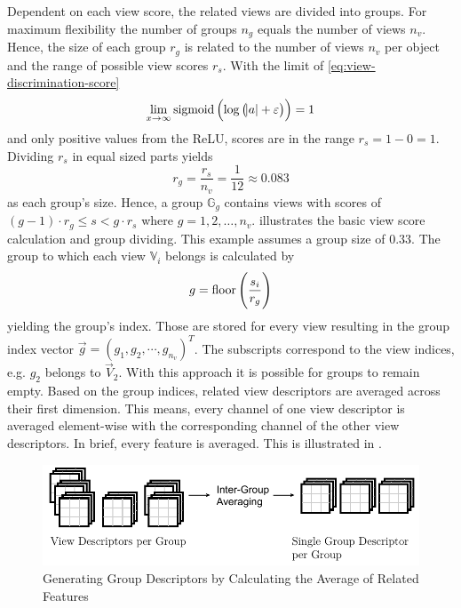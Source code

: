 Dependent on each view score, the related views are divided into groups.
For maximum flexibility the number of groups $n_g$ equals the number of views $n_v$.
Hence, the size of each group $r_g$ is related to the number of views $n_v$ per object and the range of possible view scores $r_s$.
With the limit of \eqref{eq:view-discrimination-score}
\begin{equation}
	\lim_{x\rightarrow \infty} \operatorname{sigmoid}\left( \log \left( \abs{a} + \varepsilon \right) \right) = 1
\end{equation}
and only positive values from the ReLU, scores are in the range $r_s = 1 - 0 = 1$.
Dividing $r_s$ in equal sized parts yields
\begin{equation}
	r_g = \frac{r_s}{n_v} = \frac{1}{12} \approx 0.083
\end{equation}
as each group's size.
Hence, a group $\mathbb{G}_g$ contains views with scores of $(g-1) \cdot r_g \leq s < g \cdot r_s$ where $g = {1,2, \dots, n_v}$.
 illustrates the basic view score calculation and group dividing.
This example assumes a group size of $0.33$.
The group to which each view $\mathbb{V}_i$ belongs is calculated by
\begin{equation}
	g = \operatorname{floor} \left( \frac{s_i}{r_g} \right)
\end{equation}
yielding the group's index.
Those are stored for every view resulting in the group index vector $\vec{g} = \left( g_1, g_2, \cdots, g_{n_v}\right)^T$.
The subscripts correspond to the view indices, e.g. $g_2$ belongs to $\vec{V}_2$.
With this approach it is possible for groups to remain empty.
Based on the group indices, related view descriptors are averaged across their first dimension.
This means, every channel of one view descriptor is averaged element-wise with the corresponding channel of the other view descriptors.
In brief, every feature is averaged.
This is illustrated in .
\begin{figure}
	\centering
	\includegraphics[]{images/grouping_module_group_descriptors.pdf}
	\caption[Generating Group Descriptors]{Generating Group Descriptors by Calculating the Average of Related Features}
	\label{fig:grouping-module-group-descriptors}
\end{figure}
